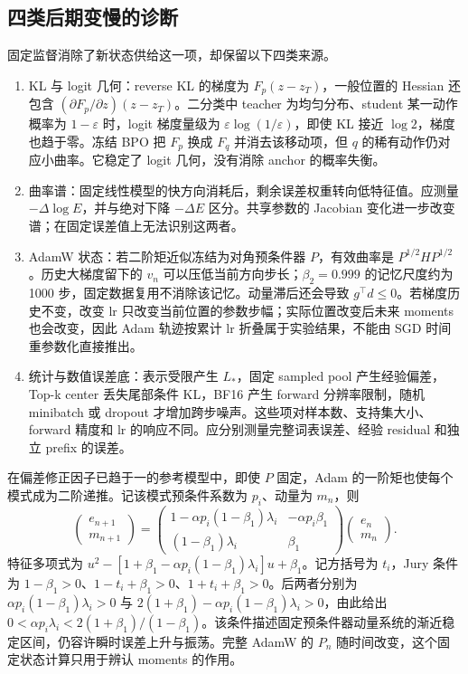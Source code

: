 \documentclass[lang=cn,scheme=chinese,openany]{../book/elegantbook}
\begin{document}
\subsection{四类后期变慢的诊断}

固定监督消除了新状态供给这一项，却保留以下四类来源。
\begin{enumerate}
\item KL 与 logit 几何：reverse KL 的梯度为 $F_p(z-z_T)$，一般位置的 Hessian 还包含 $(\partial F_p/\partial z)(z-z_T)$。二分类中 teacher 为均匀分布、student 某一动作概率为 $1-\varepsilon$ 时，logit 梯度量级为 $\varepsilon\log(1/\varepsilon)$，即使 KL 接近 $\log2$，梯度也趋于零。冻结 BPO 把 $F_p$ 换成 $F_q$ 并消去该移动项，但 $q$ 的稀有动作仍对应小曲率。它稳定了 logit 几何，没有消除 anchor 的概率失衡。
\item 曲率谱：固定线性模型的快方向消耗后，剩余误差权重转向低特征值。应测量 $-\Delta\log E$，并与绝对下降 $-\Delta E$ 区分。共享参数的 Jacobian 变化进一步改变谱；在固定误差值上无法识别这两者。
\item AdamW 状态：若二阶矩近似冻结为对角预条件器 $P$，有效曲率是 $P^{1/2}HP^{1/2}$。历史大梯度留下的 $v_n$ 可以压低当前方向步长；$\beta_2=0.999$ 的记忆尺度约为 1000 步，固定数据复用不消除该记忆。动量滞后还会导致 $g^\top d\le0$。若梯度历史不变，改变 lr 只改变当前位置的参数步幅；实际位置改变后未来 moments 也会改变，因此 Adam 轨迹按累计 lr 折叠属于实验结果，不能由 SGD 时间重参数化直接推出。
\item 统计与数值误差底：表示受限产生 $L_*$，固定 sampled pool 产生经验偏差，Top-k center 丢失尾部条件 KL，BF16 产生 forward 分辨率限制，随机 minibatch 或 dropout 才增加跨步噪声。这些项对样本数、支持集大小、forward 精度和 lr 的响应不同。应分别测量完整词表误差、经验 residual 和独立 prefix 的误差。
\end{enumerate}

在偏差修正因子已趋于一的参考模型中，即使 $P$ 固定，Adam 的一阶矩也使每个模式成为二阶递推。记该模式预条件系数为 $p_i$、动量为 $m_n$，则
\begin{equation}
\begin{pmatrix}e_{n+1}\\m_{n+1}\end{pmatrix}
=\begin{pmatrix}
1-\alpha p_i(1-\beta_1)\lambda_i&-\alpha p_i\beta_1\\
(1-\beta_1)\lambda_i&\beta_1
\end{pmatrix}
\begin{pmatrix}e_n\\m_n\end{pmatrix}.
\end{equation}
特征多项式为 $u^2-[1+\beta_1-\alpha p_i(1-\beta_1)\lambda_i]u+\beta_1$。记方括号为 $t_i$，Jury 条件为 $1-\beta_1>0$、$1-t_i+\beta_1>0$、$1+t_i+\beta_1>0$。后两者分别为 $\alpha p_i(1-\beta_1)\lambda_i>0$ 与 $2(1+\beta_1)-\alpha p_i(1-\beta_1)\lambda_i>0$，由此给出 $0<\alpha p_i\lambda_i<2(1+\beta_1)/(1-\beta_1)$。该条件描述固定预条件器动量系统的渐近稳定区间，仍容许瞬时误差上升与振荡。完整 AdamW 的 $P_n$ 随时间改变，这个固定状态计算只用于辨认 moments 的作用。
\end{document}
